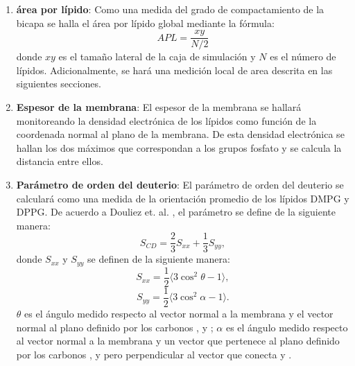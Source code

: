 \begin{enumerate}
\item \textbf{\'{a}rea por l\'{i}pido}: Como una medida del grado de compactamiento de la bicapa se halla el \'{a}rea por l\'{i}pido global mediante la f\'{o}rmula:
\begin{equation}
APL=\frac{xy}{N/2}
\end{equation}
donde $xy$ es el tama\~no lateral de la caja de simulaci\'{o}n y $N$ es el n\'{u}mero de l\'{i}pidos.
Adicionalmente, se har\'{a} una medici\'{o}n local de area descrita en las siguientes secciones.
\item \textbf{Espesor de la membrana}:
El espesor de la membrana se hallar\'{a} monitoreando la densidad electr\'{o}nica de los l\'{i}pidos como funci\'{o}n de la coordenada normal al plano de la membrana. De esta densidad electr\'{o}nica se hallan los dos m\'{a}ximos que correspondan a los grupos fosfato y se calcula la distancia entre ellos.
\item  \textbf{Par\'{a}metro de orden del deuterio}:
El par\'{a}metro de orden del deuterio se calcular\'{a} como una medida de la orientaci\'{o}n promedio de los l\'{i}pidos DMPG y DPPG. De acuerdo a Douliez et. al. \cite{Douliez1998OnBiomembranes} , el par\'{a}metro se define de la siguiente manera: \\
\begin{equation}
S_{CD}=\frac{2}{3}S_{xx}+\frac{1}{3}S_{yy},
 \end{equation}
donde $S_{xx}$ y $S_{yy}$ se definen de la siguiente manera:
\begin{equation}
S_{xx}=\frac{1}{2}\langle 3\cos^2\theta-1\rangle,
 \end{equation}
\begin{equation}
S_{yy}=\frac{1}{2}\langle 3\cos^2\alpha-1\rangle.
 \end{equation}
$\theta$ es el \'{a}ngulo medido respecto al vector normal a la membrana y el vector normal al plano definido por los carbonos ,  y ; $\alpha$ es el \'{a}ngulo medido respecto al vector normal a la membrana y un vector que pertenece al plano definido por los carbonos ,  y  pero perpendicular al vector que conecta   y .


\end{enumerate}
